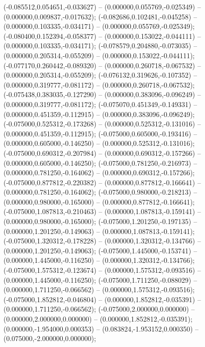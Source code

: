  (-0.085512,0.054651,-0.033627) -- (0.000000,0.055769,-0.025349) -- (0.000000,0.009837,-0.017632);
 (-0.082686,0.102481,-0.045258) -- (0.000000,0.103335,-0.034171) -- (0.000000,0.055769,-0.025349);
 (-0.080400,0.152394,-0.058377) -- (0.000000,0.153022,-0.044111) -- (0.000000,0.103335,-0.034171);
 (-0.078579,0.204880,-0.073035) -- (0.000000,0.205314,-0.055209) -- (0.000000,0.153022,-0.044111);
 (-0.077170,0.260442,-0.089320) -- (0.000000,0.260718,-0.067532) -- (0.000000,0.205314,-0.055209);
 (-0.076132,0.319626,-0.107352) -- (0.000000,0.319777,-0.081172) -- (0.000000,0.260718,-0.067532);
 (-0.075438,0.383035,-0.127290) -- (0.000000,0.383096,-0.096249) -- (0.000000,0.319777,-0.081172);
 (-0.075070,0.451349,-0.149331) -- (0.000000,0.451359,-0.112915) -- (0.000000,0.383096,-0.096249);
 (-0.075000,0.525312,-0.173268) -- (0.000000,0.525312,-0.131016) -- (0.000000,0.451359,-0.112915);
 (-0.075000,0.605000,-0.193416) -- (0.000000,0.605000,-0.146250) -- (0.000000,0.525312,-0.131016);
 (-0.075000,0.690312,-0.207984) -- (0.000000,0.690312,-0.157266) -- (0.000000,0.605000,-0.146250);
 (-0.075000,0.781250,-0.216973) -- (0.000000,0.781250,-0.164062) -- (0.000000,0.690312,-0.157266);
 (-0.075000,0.877812,-0.220382) -- (0.000000,0.877812,-0.166641) -- (0.000000,0.781250,-0.164062);
 (-0.075000,0.980000,-0.218213) -- (0.000000,0.980000,-0.165000) -- (0.000000,0.877812,-0.166641);
 (-0.075000,1.087813,-0.210463) -- (0.000000,1.087813,-0.159141) -- (0.000000,0.980000,-0.165000);
 (-0.075000,1.201250,-0.197135) -- (0.000000,1.201250,-0.149063) -- (0.000000,1.087813,-0.159141);
 (-0.075000,1.320312,-0.178228) -- (0.000000,1.320312,-0.134766) -- (0.000000,1.201250,-0.149063);
 (-0.075000,1.445000,-0.153741) -- (0.000000,1.445000,-0.116250) -- (0.000000,1.320312,-0.134766);
 (-0.075000,1.575312,-0.123674) -- (0.000000,1.575312,-0.093516) -- (0.000000,1.445000,-0.116250);
 (-0.075000,1.711250,-0.088029) -- (0.000000,1.711250,-0.066562) -- (0.000000,1.575312,-0.093516);
 (-0.075000,1.852812,-0.046804) -- (0.000000,1.852812,-0.035391) -- (0.000000,1.711250,-0.066562);
 (-0.075000,2.000000,0.000000) -- (0.000000,2.000000,0.000000) -- (0.000000,1.852812,-0.035391);
 (0.000000,-1.954000,0.000353) -- (0.083824,-1.953152,0.000350) -- (0.075000,-2.000000,0.000000);
